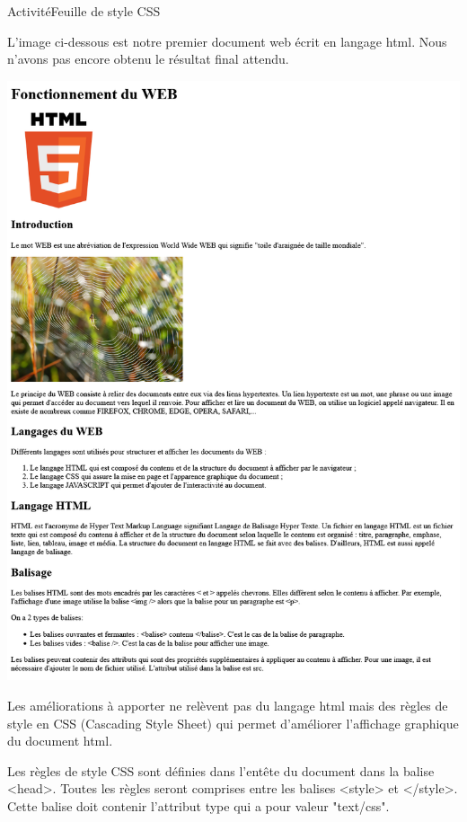 \documentclass[12pt,a4paper]{article}
\begin{document}
\begin{NSI}
{Activité}{Feuille de style CSS}
\end{NSI}


\noindent L'image ci-dessous est notre premier document web écrit en langage html. Nous n'avons pas encore obtenu le résultat final attendu.

\begin{center}
\includegraphics[scale=0.65]{img/style_css.png}
\end{center}

\newpage
Les améliorations à apporter ne relèvent pas du langage html mais des règles de style en CSS (Cascading Style Sheet) qui permet d'améliorer l'affichage graphique du document html.

Les règles de style CSS sont définies dans l'entête du document dans la balise \textsf{<head>}. Toutes les règles seront comprises entre les balises \textsf{<style>} et \textsf{</style>}. Cette balise doit contenir l'attribut \textsf{type} qui a pour valeur \textsf{"text/css"}.
\end{document}

